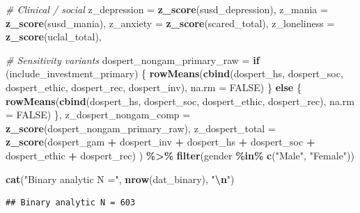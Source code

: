 \documentclass[
]{article}
\newenvironment{Shaded}{\begin{snugshade}}{\end{snugshade}}
\newcommand{\AttributeTok}[1]{\textcolor[rgb]{0.13,0.29,0.53}{#1}}
\newcommand{\CommentTok}[1]{\textcolor[rgb]{0.56,0.35,0.01}{\textit{#1}}}
\newcommand{\ConstantTok}[1]{\textcolor[rgb]{0.56,0.35,0.01}{#1}}
\newcommand{\ControlFlowTok}[1]{\textcolor[rgb]{0.13,0.29,0.53}{\textbf{#1}}}
\newcommand{\DecValTok}[1]{\textcolor[rgb]{0.00,0.00,0.81}{#1}}
\newcommand{\FunctionTok}[1]{\textcolor[rgb]{0.13,0.29,0.53}{\textbf{#1}}}
\newcommand{\NormalTok}[1]{#1}
\newcommand{\SpecialCharTok}[1]{\textcolor[rgb]{0.81,0.36,0.00}{\textbf{#1}}}
\newcommand{\StringTok}[1]{\textcolor[rgb]{0.31,0.60,0.02}{#1}}
\begin{document}
\begin{Shaded}
\begin{Highlighting}[]
    \CommentTok{\# Clinical / social}
    \AttributeTok{z\_depression =} \FunctionTok{z\_score}\NormalTok{(susd\_depression),}
    \AttributeTok{z\_mania      =} \FunctionTok{z\_score}\NormalTok{(susd\_mania),}
    \AttributeTok{z\_anxiety    =} \FunctionTok{z\_score}\NormalTok{(scared\_total),}
    \AttributeTok{z\_loneliness =} \FunctionTok{z\_score}\NormalTok{(uclal\_total),}

    \CommentTok{\# Sensitivity variants}
    \AttributeTok{dospert\_nongam\_primary\_raw =} \ControlFlowTok{if}\NormalTok{ (include\_investment\_primary) \{}
      \FunctionTok{rowMeans}\NormalTok{(}\FunctionTok{cbind}\NormalTok{(dospert\_hs, dospert\_soc, dospert\_ethic, dospert\_rec, dospert\_inv), }\AttributeTok{na.rm =} \ConstantTok{FALSE}\NormalTok{)}
\NormalTok{    \} }\ControlFlowTok{else}\NormalTok{ \{}
      \FunctionTok{rowMeans}\NormalTok{(}\FunctionTok{cbind}\NormalTok{(dospert\_hs, dospert\_soc, dospert\_ethic, dospert\_rec), }\AttributeTok{na.rm =} \ConstantTok{FALSE}\NormalTok{)}
\NormalTok{    \},}
    \AttributeTok{z\_dospert\_nongam\_comp =} \FunctionTok{z\_score}\NormalTok{(dospert\_nongam\_primary\_raw),}
    \AttributeTok{z\_dospert\_total       =} \FunctionTok{z\_score}\NormalTok{(dospert\_gam }\SpecialCharTok{+}\NormalTok{ dospert\_inv }\SpecialCharTok{+}\NormalTok{ dospert\_hs }\SpecialCharTok{+}\NormalTok{ dospert\_soc }\SpecialCharTok{+}\NormalTok{ dospert\_ethic }\SpecialCharTok{+}\NormalTok{ dospert\_rec)}
\NormalTok{  ) }\SpecialCharTok{\%\textgreater{}\%}
  \FunctionTok{filter}\NormalTok{(gender }\SpecialCharTok{\%in\%} \FunctionTok{c}\NormalTok{(}\StringTok{"Male"}\NormalTok{, }\StringTok{"Female"}\NormalTok{))}

\FunctionTok{cat}\NormalTok{(}\StringTok{"Binary analytic N ="}\NormalTok{, }\FunctionTok{nrow}\NormalTok{(dat\_binary), }\StringTok{"}\SpecialCharTok{\textbackslash{}n}\StringTok{"}\NormalTok{)}
\end{Highlighting}
\end{Shaded}

\begin{verbatim}
## Binary analytic N = 603
\end{verbatim}

\begin{Shaded}
\end{Shaded}
\end{document}
